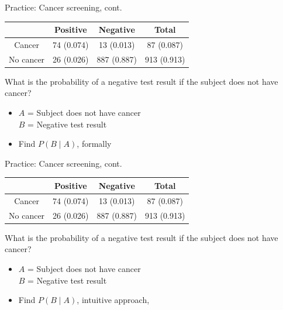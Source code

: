 \documentclass[xcolor=table, aspectratio=169, bigger]{beamer}
\begin{document}
\begin{frame}{Practice: Cancer screening, cont.}
\begin{block}{}
{\centering \renewcommand{\arraystretch}{1}
\begin{tabular}{c | c  c | c}
 & Positive & Negative & Total \\
\hline
Cancer & 74 (0.074) & 13 (0.013) & 87 (0.087)\\
No cancer & 26 (0.026) & 887 (0.887) & 913 (0.913)\\
\end{tabular}\par
\renewcommand{\arraystretch}{1.5}
}
\end{block}

\begin{exampleblock}{}
What is the probability of a negative test result if the subject does not have cancer?
\begin{itemize}
\pause
\item $A$ = Subject does not have cancer\\
$B$ = Negative test result
\pause
\item Find $P(B \mid A)$, formally\\ \smallskip
{}
\end{itemize}
\end{exampleblock}
\end{frame}

\begin{frame}{Practice: Cancer screening, cont.}
\begin{block}{}
{\centering \renewcommand{\arraystretch}{1}
\begin{tabular}{c | c  c | c}
 & Positive & Negative & Total \\
\hline
Cancer & 74 (0.074) & 13 (0.013) & 87 (0.087)\\
No cancer & 26 (0.026) & 887 (0.887) & 913 (0.913)\\
\end{tabular}\par
\renewcommand{\arraystretch}{1.5}
}
\end{block}

\begin{exampleblock}{}
What is the probability of a negative test result if the subject does not have cancer?
\begin{itemize}
\item $A$ = Subject does not have cancer\\
$B$ = Negative test result
\item Find $P(B \mid A)$, intuitive approach, \\ \smallskip
{}
\end{itemize}
\end{exampleblock}
\end{frame}
\end{document}
